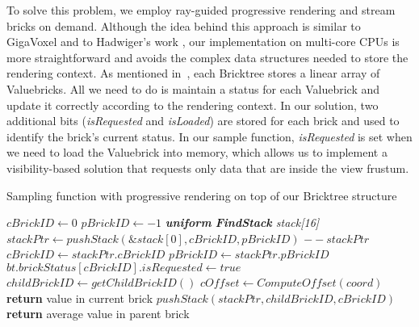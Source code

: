 To solve this problem, we employ ray-guided progressive rendering and stream bricks
on demand. Although the idea behind this approach is similar to GigaVoxel\cite{crassin2009gigavoxels}
and to Hadwiger's work \cite{hadwiger2012interactive}, our implementation on multi-core CPUs
is more straightforward and avoids the complex data structures
needed to store the rendering context. As mentioned in~,
each Bricktree stores a linear array of Valuebricks. All we need to do is maintain a
status for each Valuebrick and update it correctly according to the rendering context.
In our solution, two additional bits (\textit{isRequested} and \textit{isLoaded}) are stored 
for each brick and used to identify the brick's current status. In our sample function, 
\textit{isRequested} is set when we need to load the Valuebrick
into memory, which allows us to implement a visibility-based solution that requests only
data that are inside the view frustum. 


\begin{algorithm}[t]
	\caption{Sampling function with progressive rendering on top of our Bricktree 
    structure}\label{alg:sample_and_stream}
	\begin{algorithmic}[1]
        	\State $cBrickID\gets \textit{0}$
            \State $pBrickID\gets \textit{$-1$}$
            \State \textit{\textbf{uniform} \textbf{FindStack} stack[16]}
            \State $stackPtr\gets pushStack(\&stack[0], cBrickID, pBrickID)$
            	\State $--stackPtr$
                	\State $cBrickID \gets stackPtr.cBrickID$
                    \State $pBrickID \gets stackPtr.pBrickID$
                    	\State $bt.brickStatus[cBrickID].isRequested \gets true$
                    \EndIf
                		\State $childBrickID \gets getChildBrickID()$
            			\State $cOffset \gets ComputeOffset(coord)$
                			\State \textbf{return} value in current brick
               			\Else
                			\State $pushStack(stackPtr,childBrickID, cBrickID)$
                		\EndIf
                	\Else
                		\State \textbf{return} average value in parent brick
                	\EndIf
                 \EndIf
            \EndWhile
    	\EndProcedure
	\end{algorithmic}
\end{algorithm}



